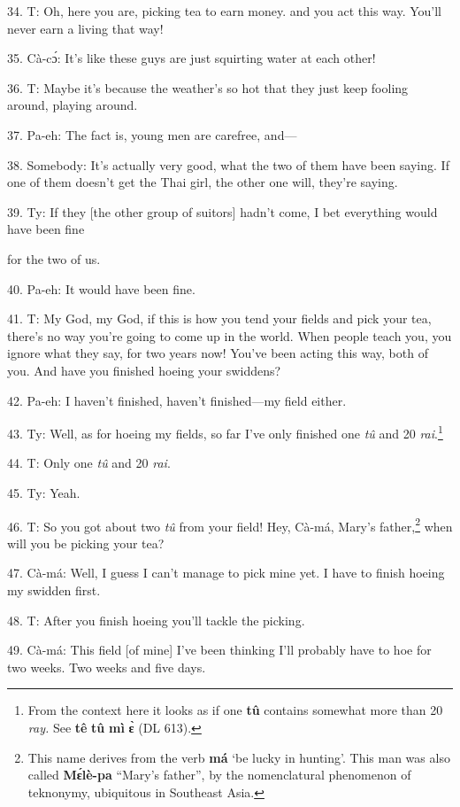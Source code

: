 34. T: Oh, here you are, picking tea to earn money. and you act this way. You'll
never earn a living that way!

35. Cà-cɔ́: It's like these guys are just squirting water at each other!

36. T: Maybe it's because the weather's so hot that they just keep fooling around,
playing around.

37. Pa-eh: The fact is, young men are carefree, and---

38. Somebody: It's actually very good, what the two of them have been saying.
If one of them doesn't get the Thai girl, the other one will, they're saying.

39. Ty: If they [the other group of suitors] hadn't come, I bet everything would
have been fine

for the two of us.

40. Pa-eh: It would have been fine.

41. T: My God, my God, if this is how you tend your fields and pick your tea,
there's no way you're going to come up in the world. When people teach you, you
ignore what they say, for two years now! You've been acting this way, both of
you. And have you finished hoeing your swiddens?

42. Pa-eh: I haven't finished, haven't finished---my field either.

43. Ty: Well, as for hoeing my fields, so far I've only finished one \textit{tû}
and 20 \textit{rai}.\footnote{From the context here it looks as if one \textbf{tû} contains somewhat more than 20 \textit{ray.} See \textbf{tê} \textbf{tû} \textbf{mì} \textbf{ɛ̀} (DL 613).}

44. T: Only one \textit{tû} and 20 \textit{rai}.

45. Ty: Yeah.

46. T: So you got about two \textit{tû} from your field! Hey, Cà-má, Mary's
father,\footnote{This name derives from the verb \textbf{má} `be lucky in hunting'. This man was also called \textbf{Mɛ́lè-pa} ``Mary's father'', by the nomenclatural phenomenon of teknonymy, ubiquitous in Southeast Asia.} when will you be picking your tea?

47. Cà-má: Well, I guess I can't manage to pick mine yet. I have to finish hoeing
my swidden first.

48. T: After you finish hoeing you'll tackle the picking.

49. Cà-má: This field [of mine] I've been thinking I'll probably have to hoe
for two weeks. Two weeks and five days.

